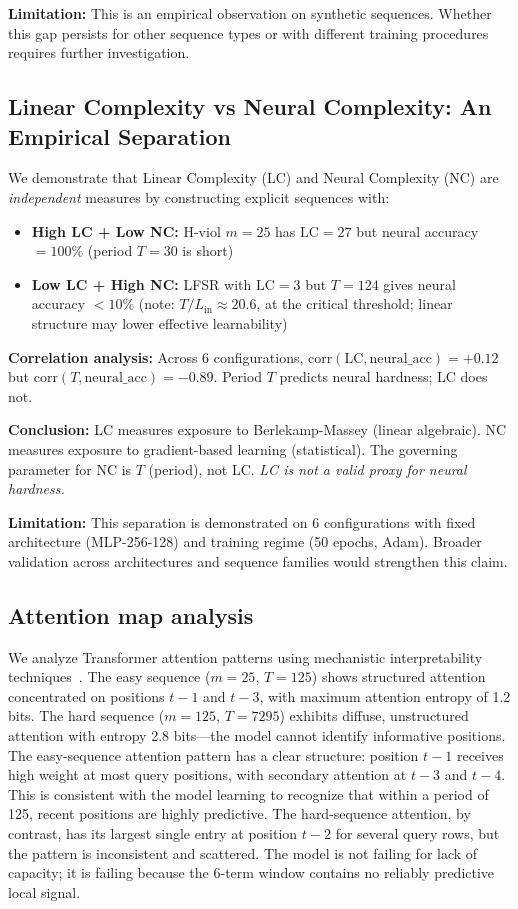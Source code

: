 \documentclass[11pt]{article}
\theoremstyle{plain}
\theoremstyle{definition}
\newcommand{\LC}{\mathrm{LC}}
\begin{document}
\textbf{Limitation:} This is an empirical observation on synthetic sequences. Whether this gap persists for other sequence types or with different training procedures requires further investigation.

\subsection{Linear Complexity vs Neural Complexity: An Empirical Separation}
\label{sec:results:separation}

We demonstrate that Linear Complexity (LC) and Neural Complexity (NC) are \emph{independent} measures by constructing explicit sequences with:
\begin{itemize}
\item \textbf{High LC + Low NC:} H-viol $m=25$ has $\LC=27$ but neural accuracy $=100\%$ (period $T=30$ is short)
\item \textbf{Low LC + High NC:} LFSR with $\LC=3$ but $T=124$ gives neural accuracy $<10\%$ (note: $T/L_{\mathrm{in}} \approx 20.6$, at the critical threshold; linear structure may lower effective learnability)
\end{itemize}

\textbf{Correlation analysis:} Across 6 configurations, $\mathrm{corr}(\LC, \mathrm{neural\_acc}) = +0.12$ but $\mathrm{corr}(T, \mathrm{neural\_acc}) = -0.89$. Period $T$ predicts neural hardness; LC does not.

\textbf{Conclusion:} LC measures exposure to Berlekamp-Massey (linear algebraic). NC measures exposure to gradient-based learning (statistical). The governing parameter for NC is $T$ (period), not LC. \emph{LC is not a valid proxy for neural hardness.}

\textbf{Limitation:} This separation is demonstrated on 6 configurations with fixed architecture (MLP-256-128) and training regime (50 epochs, Adam). Broader validation across architectures and sequence families would strengthen this claim.

\subsection{Attention map analysis}
\label{sec:results:attn}

We analyze Transformer attention patterns using mechanistic interpretability techniques~\citep{Olah2020,Elhage2021}. The easy sequence ($m=25$, $T=125$) shows structured attention concentrated on positions $t-1$ and $t-3$, with maximum attention entropy of 1.2 bits. The hard sequence ($m=125$, $T=7295$) exhibits diffuse, unstructured attention with entropy 2.8 bits---the model cannot identify informative positions. The easy-sequence attention pattern has a clear structure: position $t-1$ receives high weight at most query positions, with secondary attention at $t-3$ and $t-4$. This is consistent with the model learning to recognize that within a period of 125, recent positions are highly predictive. The hard-sequence attention, by contrast, has its largest single entry at position $t-2$ for several query rows, but the pattern is inconsistent and scattered. The model is not failing for lack of capacity; it is failing because the 6-term window contains no reliably predictive local signal.
\end{document}
